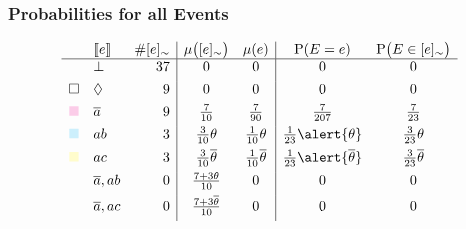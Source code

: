 \documentclass[bigger,xcolor={x11names,svgnames}]{beamer}
\newcommand{\at}[1]{\ensuremath{\!\del{#1}}}
\newcommand{\class}[1]{\ensuremath{[{#1}]_{\sim}}}
\newcommand{\co}[1]{\ensuremath{\overline{#1}}}
\newcommand{\inconsistent}{\bot}
\newcommand{\indepclass}{\ensuremath{\Diamond}}
\newcommand{\pr}[1]{\ensuremath{\mathrm{P}\at{#1}}}
\newcommand{\pw}[1]{\ensuremath{\mu\at{#1}}}
\newcommand{\stablecore}[1]{\ensuremath{\left\llbracket #1 \right\rrbracket}}
\begin{document}
%
\begin{frame}
    \frametitle{Probabilities for all Events}
    \vfill

    \begin{equation*}
        \begin{array}{clr|cc|cc}
            & \stablecore{e}
            & \# \class{e}
            & \pw{\class{e}}
            & \pw{e}
            & \pr{E = e}
            & \pr{E \in \class{e}}
            \\
            \hline
            & \inconsistent
            & 37
            & 0
            & 0
            & 0
            & 0
            \\[4pt]
            \square 
            & \indepclass
            & 9
            & 0
            & 0
            & 0
            & 0
            \\[4pt]
            {\color{magenta!20}\blacksquare }
            & \co{a}
            & 9
            & \frac{7}{10}
            & \frac{7}{90}
            & \frac{7}{207}
            & \frac{7}{23}
            \\[4pt]
            {\color{cyan!20}\blacksquare }
            & ab
            & 3
            & \frac{3}{10}\theta
            & \frac{1}{10}\theta
            & \frac{1}{23}\alert{\theta}
            & \frac{3}{23}\theta
            \\[4pt]
            {\color{yellow!20}\blacksquare }
            & ac
            & 3
            & \frac{3}{10}\co{\theta}
            & \frac{1}{10}\co{\theta}
            & \frac{1}{23}\alert{\co{\theta}}
            & \frac{3}{23}\co{\theta}
            \\[4pt]
            & \co{a}, ab
            & 0
            & \frac{7 + 3\theta}{10}
            & 0
            & 0
            & 0
            \\[4pt]
            & \co{a}, ac
            & 0
            & \frac{7 + 3\co{\theta}}{10}
            & 0
            & 0
            & 0
            \\[4pt]

\end{array}
\end{equation*}
\end{frame}
\end{document}
